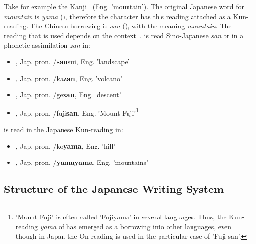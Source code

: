 Take for example the Kanji ~(Eng. 'mountain'). 
The original Japanese word for \emph{mountain} is \emph{yama} (),
therefore the character  has this reading attached as a Kun-reading.
The Chinese borrowing is \emph{san} (), with the meaning 
\emph{mountain}. The reading that is used depends on the 
context~.
 is read Sino-Japanese \emph{san} or in a phonetic assimilation \emph{zan} in:
\begin{itemize}
  \item {}, Jap. pron. /\textbf{san}sui, Eng. 'landscape'
  \item {}, Jap. pron. /ka\textbf{zan}, Eng. 'volcano'
  \item {}, Jap. pron. /ge\textbf{zan}, Eng. 'descent'
  \item {}, Jap. pron. /fuji\textbf{san}, Eng. 
        'Mount Fuji'\footnote{'Mount Fuji' is often called 'Fujiyama' in 
        several languages. Thus, the Kun-reading \emph{yama} of  has 
        emerged as a borrowing into other languages, even though in Japan 
        the On-reading is used in the particular case of 'Fuji san'.}
\end{itemize}
 is read in the Japanese Kun-reading in:
\begin{itemize}
  \item {}, Jap. pron. /ko\textbf{yama}, Eng. 'hill'
  \item {}, Jap. pron. /\textbf{yamayama}, Eng. 'mountains'
\end{itemize}

\subsection{Structure of the Japanese Writing System}
\label{sec:structureofwritingsystem}

